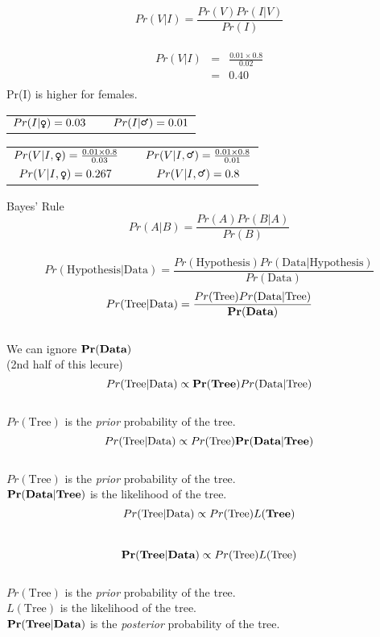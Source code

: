 \documentclass{seminar}
\begin{document}
\begin{slide}
\newslide
\[ Pr(V|I) = \frac{Pr(V) Pr(I|V)}{Pr(I)}\]
\\[15pt]
\begin{eqnarray*}
Pr(V|I) &= & \frac{0.01\times 0.8}{0.02} \\[15pt]
	& = & 0.40 \\
\end{eqnarray*}
\newslide
Pr(I) is higher for females.
\begin{tabular}{ccc}
$Pr(I | \mbox{\Female}) = 0.03$ & &$Pr(I|\mbox{\Male}) = 0.01$\\[45pt]
\end{tabular}

\begin{tabular}{ccc}
$Pr(V|I,\mbox{\Female}) =  \frac{0.01\times 0.8}{0.03}$&\vline &$Pr(V|I,\mbox{\Male}) =  \frac{0.01\times 0.8}{0.01}$ \\[15pt]
$Pr(V|I,\mbox{\Female}) =  0.267$& \vline&$Pr(V|I,\mbox{\Male}) =  0.8$ \\[15pt]
\end{tabular}

\newslide
\Large Bayes' Rule\\[45pt]
\[Pr(A|B) = \frac{Pr(A)Pr(B|A)}{Pr(B)}\]\\[45pt]\large
\[Pr(\mbox{Hypothesis}|\mbox{Data}) = \frac{Pr(\mbox{Hypothesis})Pr(\mbox{Data}|\mbox{Hypothesis})}{Pr(\mbox{Data})}\]
\newslide
\[Pr(\mbox{Tree}|\mbox{Data}) = \frac{Pr(\mbox{Tree})Pr(\mbox{Data}|\mbox{Tree})}{\bf Pr(\mbox{\bf Data})}\]\\[15pt]
We can ignore ${\bf Pr(\mbox{\bf Data})}$ \\[15pt]
(2nd half of this lecure)
\newslide
\[Pr(\mbox{Tree}|\mbox{Data}) \propto {\bf Pr(\mbox{\bf Tree})}Pr(\mbox{Data}|\mbox{Tree})\]\\[30pt]
$Pr(\mbox{Tree})$ is the {\em prior} probability of the tree.\\[15pt]
\newslide
\[Pr(\mbox{Tree}|\mbox{Data}) \propto Pr(\mbox{Tree}) {\bf Pr(\mbox{\bf Data}|\mbox{\bf Tree}) }\]\\[30pt]
$Pr(\mbox{Tree})$ is the {\em prior} probability of the tree.\\[15pt]
${\bf Pr(\mbox{\bf Data}|\mbox{\bf Tree}) }$ is the likelihood of the tree.\\[30pt]
\[Pr(\mbox{Tree}|\mbox{Data}) \propto Pr(\mbox{Tree}) L(\mbox{\bf Tree}) \]\\[30pt]
\newslide
\[{\bf Pr(\mbox{\bf Tree}|\mbox{\bf Data}) } \propto Pr(\mbox{Tree})L(\mbox{Tree})\]\\[30pt]
$Pr(\mbox{Tree})$ is the {\em prior} probability of the tree.\\[15pt]
 $L(\mbox{Tree})$ is the likelihood of the tree.\\[15pt]
${\bf Pr(\mbox{\bf Tree}|\mbox{\bf Data}) }$ is the {\em posterior} probability of the tree.\\[15pt]


\end{slide}
\end{document}
